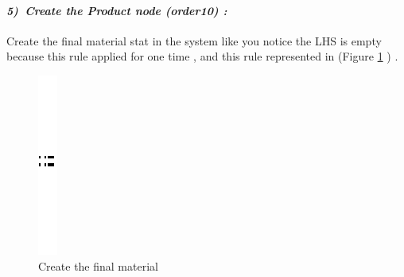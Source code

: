\paragraph{\emph{5)~Create the Product node (order10) :} }
Create the final material stat in the system like you notice the LHS is empty because this rule applied for one time , and this rule represented in 
(Figure \ref{fig:Create the final material} ) .

\vspace{1cm}
\begin{figure}[th]
\centering
	\quad{}
		\includegraphics{Chapiter3/img/sep}
	\quad{}
\caption{\label{fig:Create the final material}Create the final material}
 
\end{figure}
\vspace{1cm}

